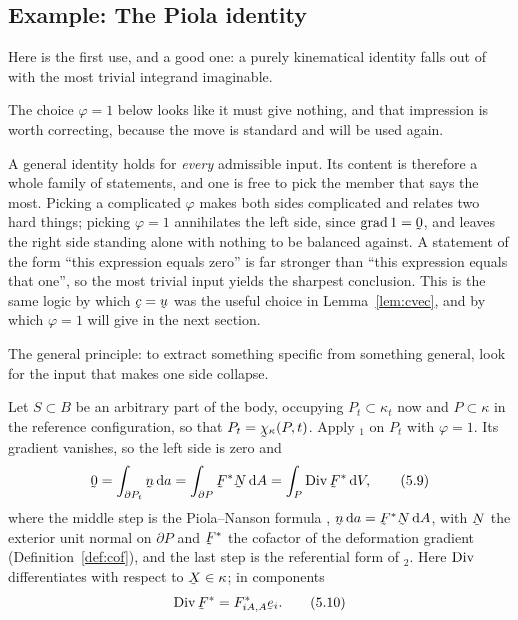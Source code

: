 \subsection{Example: The Piola identity}\label{sec:piolaid}

Here is the first use, and a good one: a purely kinematical identity
falls out of  with the most trivial integrand imaginable.

\begin{remark}\label{rem:whyphione}
The choice $\varphi=1$ below looks like it must give nothing, and that
impression is worth correcting, because the move is standard and will be
used again.

A general identity holds for \emph{every} admissible input. Its content is
therefore a whole family of statements, and one is free to pick the member
that says the most. Picking a complicated $\varphi$ makes both sides
complicated and relates two hard things; picking $\varphi=1$ annihilates the left side, since $\grad 1=\bze$, and
leaves the right side standing alone with nothing to be balanced
against. A statement of the form ``this expression
equals zero'' is far stronger than ``this expression equals that one'', so
the most trivial input yields the sharpest conclusion. This is the same
logic by which $\bc=\bu$ was the useful choice in Lemma~\ref{lem:cvec},
and by which $\varphi=1$ will give  in the next section.

The general principle: to extract something specific from something
general, look for the input that makes one side collapse.
\end{remark}

Let $S\subset B$ be an arbitrary part of the body, occupying $P_{t}\subset
\kappa_{t}$ now and $P\subset\kappa$ in the reference configuration, so
that $P_{t}=\bchi_{\kappa}(P,t)$. Apply $_{1}$ on $P_{t}$ with
$\varphi=1$. Its gradient vanishes, so the left side is zero and
\begin{equation}
   \bze=\int_{\partial P_{t}}\bn\,\dl a
       =\int_{\partial P}\bF^{*}\bN\,\dl A
       =\int_{P}\Dvg\bF^{*}\,\dl V ,
   \tag{5.9}\label{eq:5.9}
\end{equation}
where the middle step is the Piola--Nanson formula ,
$\bn\,\dl a=\bF^{*}\bN\,\dl A$, with $\bN$ the exterior unit normal on
$\partial P$ and $\bF^{*}$ the cofactor of the deformation gradient
(Definition~\ref{def:cof}), and the last step is the referential form of
$_{2}$. Here $\operatorname{Div}$ differentiates with respect to
$\bX\in\kappa$; in components
\begin{equation}
   \Dvg\bF^{*}=F^{*}_{iA,A}\be_{i}.
   \tag{5.10}\label{eq:5.10}
\end{equation}

